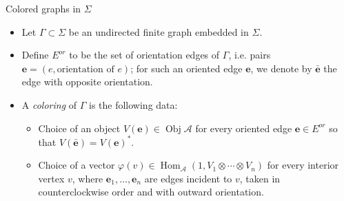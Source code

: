 \documentclass{beamer}
\newcommand{\ph}{\varphi}
\newcommand{\ee}{\mathbf{e}}
\DeclareMathOperator{\Obj}{Obj}
\DeclareMathOperator{\Hom}{Hom}
\begin{document}
\begin{frame}{Colored graphs in $\Sigma$}
\begin{itemize}
\item Let $\Gamma \subset \Sigma$ be an undirected finite graph embedded in $\Sigma$.

\pause \item Define $E^{or}$ to be the set of orientation edges of $\Gamma$, i.e. pairs $\ee=(e,
\text{orientation of } e)$; for such an oriented edge $\ee$, we denote by $\bar{\ee}$ the edge with opposite orientation. 

\pause \item A {\em coloring} of $\Gamma$ is the
following data: 
\begin{itemize}
    \item Choice of an object $V(\ee)\in \Obj \mathcal A$ for every oriented edge  $\ee \in E^{or}$ so that $V(\bar{\ee})=V(\ee)^*$.
    \pause \item Choice of a vector $\ph(v)\in \Hom_{\mathcal A}(1, V_1 \otimes \cdots \otimes V_n)$  for  every interior vertex $v$, where 
      $\ee_1, \dots, \ee_n$ are edges incident to $v$, taken in counterclockwise 
      order and with outward orientation.
\end{itemize}
\end{itemize}
\end{frame}
\end{document}

